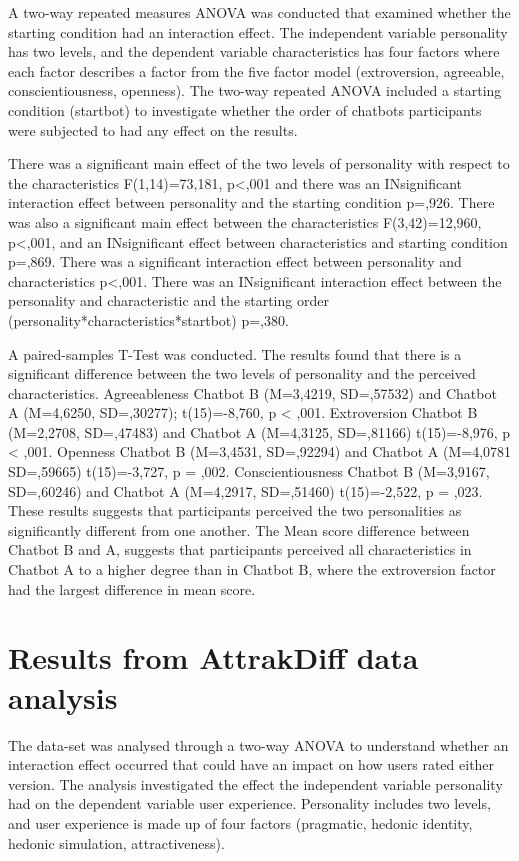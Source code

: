 A two-way repeated measures ANOVA was conducted that examined whether the starting condition had an interaction effect. The independent variable personality has two levels, and the dependent variable characteristics has four factors where each factor describes a factor from the five factor model (extroversion, agreeable, conscientiousness, openness). The two-way repeated ANOVA included a starting condition (startbot) to investigate whether the order of chatbots participants were subjected to had any effect on the results.

There was a significant main effect of the two levels of personality with respect to the characteristics F(1,14)=73,181, p<,001 and there was an INsignificant interaction effect between personality and the starting condition p=,926. There was also a significant main effect between the characteristics F(3,42)=12,960, p<,001, and an INsignificant effect between characteristics and starting condition p=,869. There was a significant interaction effect between personality and characteristics p<,001. There was an INsignificant interaction effect between the personality and characteristic and the starting order (personality*characteristics*startbot) p=,380.

A paired-samples T-Test was conducted. The results found that there is a significant difference between the two levels of personality and the perceived characteristics. Agreeableness Chatbot B (M=3,4219, SD=,57532) and Chatbot A (M=4,6250, SD=,30277); t(15)=-8,760, p < ,001. Extroversion Chatbot B (M=2,2708, SD=,47483) and Chatbot A (M=4,3125, SD=,81166) t(15)=-8,976, p < ,001. Openness Chatbot B (M=3,4531, SD=,92294) and Chatbot A (M=4,0781 SD=,59665) t(15)=-3,727, p = ,002. Conscientiousness Chatbot B (M=3,9167, SD=,60246) and Chatbot A (M=4,2917, SD=,51460) t(15)=-2,522, p = ,023. These results suggests that participants perceived the two personalities as significantly different from one another. The Mean score difference between Chatbot B and A, suggests that participants perceived all characteristics in Chatbot A to a higher degree than in Chatbot B, where the extroversion factor had the largest difference in mean score.

\section{Results from AttrakDiff data analysis }
        
The data-set was analysed through a two-way ANOVA to understand whether an interaction effect occurred that could have an impact on how users rated either version. The analysis investigated the effect the independent variable personality had on the dependent variable user experience. Personality includes two levels, and user experience is made up of four factors (pragmatic, hedonic identity, hedonic simulation, attractiveness).

